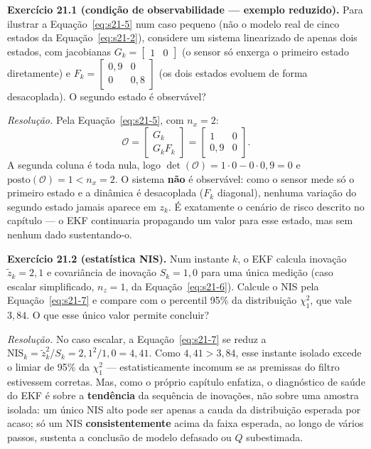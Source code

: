 \documentclass[12pt,a4paper]{article}
\numberwithin{equation}{section}
\numberwithin{table}{section}
\numberwithin{figure}{section}
\begin{document}
	\textbf{Exercício 21.1 (condição de observabilidade --- exemplo
	reduzido).} Para ilustrar a Equação~\eqref{eq:s21-5} num caso pequeno
	(não o modelo real de cinco estados da Equação~\eqref{eq:s21-2}),
	considere um sistema linearizado de apenas dois estados, com
	jacobianas $G_k = \begin{bmatrix}1 & 0\end{bmatrix}$ (o sensor só
	enxerga o primeiro estado diretamente) e
	$F_k = \begin{bmatrix}0{,}9 & 0\\ 0 & 0{,}8\end{bmatrix}$ (os dois
	estados evoluem de forma desacoplada). O segundo estado é observável?

	\emph{Resolução.} Pela Equação~\eqref{eq:s21-5}, com $n_x=2$:
	$$\mathcal{O} = \begin{bmatrix} G_k \\ G_k F_k \end{bmatrix}
	= \begin{bmatrix} 1 & 0 \\ 0{,}9 & 0 \end{bmatrix}.$$
	A segunda coluna é toda nula, logo
	$\det(\mathcal{O}) = 1\cdot 0 - 0\cdot 0{,}9 = 0$ e
	$\text{posto}(\mathcal{O}) = 1 < n_x = 2$. O sistema \textbf{não} é
	observável: como o sensor mede só o primeiro estado e a dinâmica é
	desacoplada ($F_k$ diagonal), nenhuma variação do segundo estado
	jamais aparece em $z_k$. É exatamente o cenário de risco descrito no
	capítulo --- o EKF continuaria propagando um valor para esse estado,
	mas sem nenhum dado sustentando-o.

	\textbf{Exercício 21.2 (estatística NIS).} Num instante $k$, o EKF
	calcula inovação $\tilde z_k = 2{,}1$ e covariância de inovação
	$S_k = 1{,}0$ para uma única medição (caso escalar simplificado,
	$n_z=1$, da Equação~\eqref{eq:s21-6}). Calcule o NIS pela
	Equação~\eqref{eq:s21-7} e compare com o percentil 95\% da
	distribuição $\chi^2_1$, que vale $3{,}84$. O que esse único valor
	permite concluir?

	\emph{Resolução.} No caso escalar, a Equação~\eqref{eq:s21-7} se
	reduz a $\text{NIS}_k = \tilde z_k^2 / S_k = 2{,}1^2/1{,}0 = 4{,}41$.
	Como $4{,}41 > 3{,}84$, esse instante isolado excede o limiar de
	95\% da $\chi^2_1$ --- estatisticamente incomum se as premissas do
	filtro estivessem corretas. Mas, como o próprio capítulo enfatiza, o
	diagnóstico de saúde do EKF é sobre a \textbf{tendência} da sequência
	de inovações, não sobre uma amostra isolada: um único NIS alto pode
	ser apenas a cauda da distribuição esperada por acaso; só um NIS
	\textbf{consistentemente} acima da faixa esperada, ao longo de vários
	passos, sustenta a conclusão de modelo defasado ou $Q$ subestimada.
\end{document}
